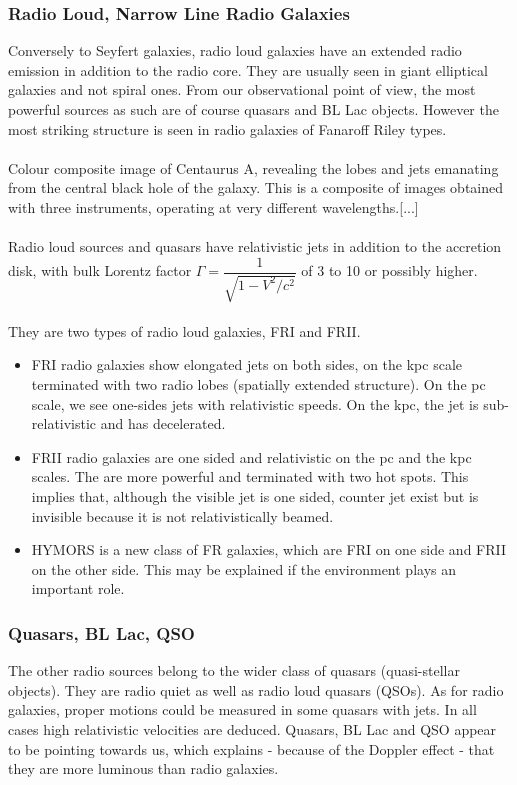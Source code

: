 \documentclass[10pt,a4paper,english]{article}
\begin{document}
\subsubsection{Radio Loud, Narrow Line Radio Galaxies}
Conversely to Seyfert galaxies, radio loud galaxies have an extended radio emission in addition to the radio core. They are usually seen in giant elliptical galaxies and not spiral ones. From our observational point of view, the most powerful sources as such are of course quasars and BL Lac objects. However the most striking structure is seen in radio galaxies of Fanaroff Riley types.\\
\\
Colour composite image of Centaurus A, revealing the lobes and jets emanating from the central black hole of the galaxy. This is a composite of images obtained with three instruments, operating at very different wavelengths.[...]\\
\\
Radio loud sources and quasars have relativistic jets in addition to the accretion disk, with bulk Lorentz factor $\Gamma=\dfrac{1}{\sqrt{1-V^2/c^2}}$ of 3 to 10 or possibly higher.\\
\\
They are two types of radio loud galaxies, FRI and FRII.
\begin{itemize}
\item FRI radio galaxies show elongated jets on both sides, on the kpc scale terminated with two radio lobes (spatially extended structure). On the pc scale, we see one-sides jets with relativistic speeds. On the kpc, the jet is sub-relativistic and has decelerated.
\item FRII radio galaxies are one sided and relativistic on the pc and the kpc scales. The are more powerful and terminated with two hot spots. This implies that, although the visible jet is one sided, counter jet exist but is invisible because it is not relativistically beamed.
\item HYMORS is a new class of FR galaxies, which are FRI on one side and FRII on the other side. This may be explained if the environment plays an important role.
\end{itemize}
\subsubsection{Quasars, BL Lac, QSO}
The other radio sources belong to the wider class of quasars (quasi-stellar objects). They are radio quiet as well as radio loud quasars (QSOs). As for radio galaxies, proper motions could be measured in some quasars with jets. In all cases high relativistic velocities are deduced. Quasars, BL Lac and QSO appear to be pointing towards us, which explains - because of the Doppler effect - that they are more luminous than radio galaxies.
\end{document}
